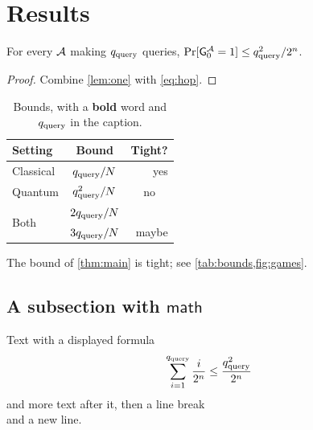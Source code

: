 \section{Results}\label{sec:results}

\begin{theorem}[Main]\label{thm:main}
For every $\mathcal{A}$ making $q_{\mathrm{query}}$ queries, $\Pr[\mathsf{G}_{0}^{\mathcal{A}}=1]\le q_{\mathrm{query}}^2/2^n$.
\end{theorem}
\begin{proof}
Combine \cref{lem:one} with \eqref{eq:hop}.
\end{proof}

\begin{table}[t]
\caption{Bounds, with a \textbf{bold} word and $q_{\mathrm{query}}$ in the caption.}\label{tab:bounds}
\centering
\begin{tabular}{@{}lcr@{}}
\toprule
Setting & Bound & Tight? \\
\midrule
Classical & $q_{\mathrm{query}}/N$ & yes \\
Quantum & $q_{\mathrm{query}}^2/N$ & \multicolumn{1}{c}{no} \\
\multirow{2}{*}{Both} & $2q_{\mathrm{query}}/N$ & \\
 & $3q_{\mathrm{query}}/N$ & maybe \\
\bottomrule
\end{tabular}
\end{table}

\begin{corollary}
The bound of \cref{thm:main} is tight; see \cref{tab:bounds,fig:games}.
\end{corollary}

\subsection{A subsection with $\mathsf{math}$}\label{sec:sub}
Text with a displayed formula
\[
  \sum_{i=1}^{q_{\mathrm{query}}} \frac{i}{2^n} \le \frac{q_{\mathrm{query}}^2}{2^n}
\]
and more text after it, then a line break\\ and a new line.
